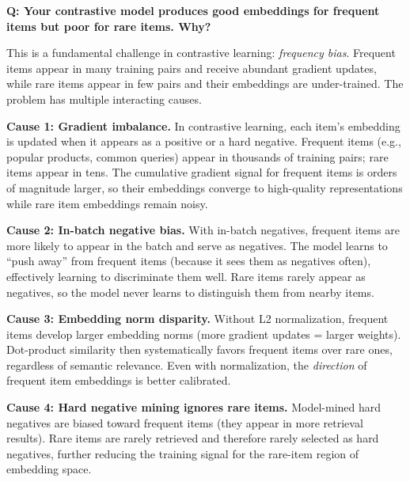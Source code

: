 \begin{interviewq}
\end{interviewq}


\begin{interviewq}
\textbf{Q: Your contrastive model produces good embeddings for frequent items but poor for rare items. Why?}

 \quad {} \quad \badgefreq{\freqlow}

\stronganswer

This is a fundamental challenge in contrastive learning: \textit{frequency bias}. Frequent items appear in many training pairs and receive abundant gradient updates, while rare items appear in few pairs and their embeddings are under-trained. The problem has multiple interacting causes.

\textbf{Cause 1: Gradient imbalance.} In contrastive learning, each item's embedding is updated when it appears as a positive or a hard negative. Frequent items (e.g., popular products, common queries) appear in thousands of training pairs; rare items appear in tens. The cumulative gradient signal for frequent items is orders of magnitude larger, so their embeddings converge to high-quality representations while rare item embeddings remain noisy.

\textbf{Cause 2: In-batch negative bias.} With in-batch negatives, frequent items are more likely to appear in the batch and serve as negatives. The model learns to ``push away'' from frequent items (because it sees them as negatives often), effectively learning to discriminate them well. Rare items rarely appear as negatives, so the model never learns to distinguish them from nearby items.

\textbf{Cause 3: Embedding norm disparity.} Without L2 normalization, frequent items develop larger embedding norms (more gradient updates = larger weights). Dot-product similarity then systematically favors frequent items over rare ones, regardless of semantic relevance. Even with normalization, the \textit{direction} of frequent item embeddings is better calibrated.

\textbf{Cause 4: Hard negative mining ignores rare items.} Model-mined hard negatives are biased toward frequent items (they appear in more retrieval results). Rare items are rarely retrieved and therefore rarely selected as hard negatives, further reducing the training signal for the rare-item region of embedding space.


\end{interviewq}
